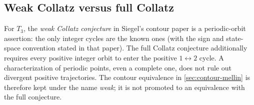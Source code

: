 \subsection{Weak Collatz versus full Collatz}

For $T_3$, the \emph{weak Collatz conjecture} in Siegel's contour paper is a
periodic-orbit assertion: the only integer cycles are the known ones (with
the sign and state-space convention stated in that paper).  The full Collatz
conjecture additionally requires every positive integer orbit to enter the
positive $1\leftrightarrow2$ cycle.  A characterization of periodic points,
even a complete one, does not rule out divergent positive trajectories.
The contour equivalence in \cref{sec:contour-mellin} is therefore kept under
the name \emph{weak}; it is not promoted to an equivalence with the full
conjecture.
